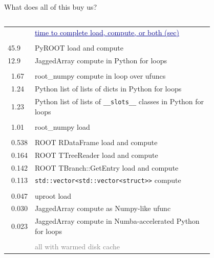 \documentclass[aspectratio=169]{beamer}
\begin{document}
\begin{frame}{What does all of this buy us?}
\begin{columns}
\begin{columns}
\begin{tabular}{r p{0.9\linewidth}}
& \textcolor{darkblue}{\small\underline{time to complete load, compute, or both (sec)}} \\
& \\
45.9\textcolor{white}{00} & \textcolor{rootcolor}{PyROOT load and compute} \\
12.9\textcolor{white}{00} & \textcolor{mycolor}{JaggedArray compute in Python for loops} \\
& \\
1.67\textcolor{white}{0} & \textcolor{rootnpcolor}{root\_numpy compute in loop over ufuncs} \\
 1.24\textcolor{white}{0} & \textcolor{pythoncolor}{Python list of lists of dicts in Python for loops} \\
 1.23\textcolor{white}{0} & \textcolor{pythoncolor}{Python list of lists of {\tt\scriptsize \_\_slots\_\_} classes in Python for loops} \\
& \\
 1.01\textcolor{white}{0} & \textcolor{rootnpcolor}{root\_numpy load} \\
& \\
 0.538 & \textcolor{rootcolor}{ROOT RDataFrame load and compute} \\
 0.164 & \textcolor{rootcolor}{ROOT TTreeReader load and compute} \\
 0.142 & \textcolor{rootcolor}{ROOT TBranch::GetEntry load and compute} \\
 0.113 & \textcolor{cppcolor}{{\tt\scriptsize std::vector<std::vector<struct>>} compute} \\
& \\
 0.047 & \textcolor{mycolor}{uproot load} \\
 0.030 & \textcolor{mycolor}{JaggedArray compute as Numpy-like ufunc} \\
 0.023 & \textcolor{mycolor}{JaggedArray compute in Numba-accelerated Python for loops} \\
& \\
& \textcolor{gray}{\scriptsize all with warmed disk cache} \\
\end{tabular}
\end{columns}
\end{columns}
\end{frame}
\end{document}
